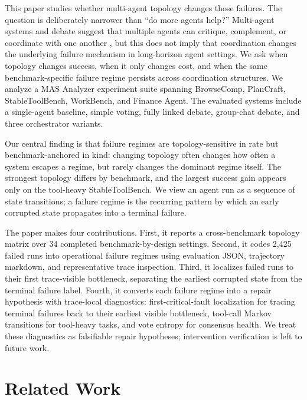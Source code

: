 \documentclass{article}
\theoremstyle{plain}
\theoremstyle{definition}
\theoremstyle{remark}
\begin{document}
This paper studies whether multi-agent topology changes those failures. The question is deliberately narrower than ``do more agents help?'' Multi-agent systems and debate suggest that multiple agents can critique, complement, or coordinate with one another \cite{camel,multiagentdebate}, but this does not imply that coordination changes the underlying failure mechanism in long-horizon agent settings. We ask when topology changes success, when it only changes cost, and when the same benchmark-specific failure regime persists across coordination structures. We analyze a MAS Analyzer experiment suite spanning BrowseComp, PlanCraft, StableToolBench, WorkBench, and Finance Agent. The evaluated systems include a single-agent baseline, simple voting, fully linked debate, group-chat debate, and three orchestrator variants.

Our central finding is that failure regimes are topology-sensitive in rate but benchmark-anchored in kind: changing topology often changes how often a system escapes a regime, but rarely changes the dominant regime itself. The strongest topology differs by benchmark, and the largest success gain appears only on the tool-heavy StableToolBench. We view an agent run as a sequence of state transitions; a failure regime is the recurring pattern by which an early corrupted state propagates into a terminal failure.

The paper makes four contributions. First, it reports a cross-benchmark topology matrix over 34 completed benchmark-by-design settings. Second, it codes 2,425 failed runs into operational failure regimes using evaluation JSON, trajectory markdown, and representative trace inspection. Third, it localizes failed runs to their first trace-visible bottleneck, separating the earliest corrupted state from the terminal failure label. Fourth, it converts each failure regime into a repair hypothesis with trace-local diagnostics: first-critical-fault localization for tracing terminal failures back to their earliest visible bottleneck, tool-call Markov transitions for tool-heavy tasks, and vote entropy for consensus health. We treat these diagnostics as falsifiable repair hypotheses; intervention verification is left to future work.

\section{Related Work}
\end{document}
